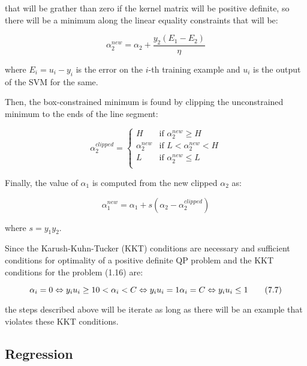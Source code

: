 that will be grather than zero if the kernel matrix will be positive definite, so there will be a minimum along the linear equality constraints that will be:

\begin{equation}
	\alpha_2^{new} = \alpha_2 + \frac{y_2(E_1 - E_2)}{\eta} \tag{7.4}
\end{equation}

where $E_i = u_i - y_i$ is the error on the $i$-th training example and $u_i$ is the output of the SVM for the same.

Then, the box-constrained minimum is found by clipping the unconstrained minimum to the ends of the line segment:

\begin{equation}
    \alpha_2^{clipped} =
        \begin{cases}
            H & \text{if } \alpha_2^{new} \geq H \\
            \alpha_2^{new} & \text{if } L < \alpha_2^{new} < H \\
            L & \text{if } \alpha_2^{new} \leq L \\
        \end{cases} \tag{7.5}
\end{equation}

Finally, the value of $\alpha_1$ is computed from the new clipped $\alpha_2$ as:

\begin{equation}
	\alpha_1^{new} = \alpha_1 + s (\alpha_2 - \alpha_2^{clipped}) \tag{7.6}
\end{equation}

where $s = y_1 y_2$.

Since the Karush-Kuhn-Tucker (KKT) conditions are necessary and sufficient conditions for optimality of a positive definite QP problem and the KKT conditions for the problem (1.16) are:

\begin{equation}
	\alpha_i = 0 \Leftrightarrow y_i u_i \geq 1 \\
	0 < \alpha_i < C \Leftrightarrow y_i u_i = 1 \\
	\alpha_i = C \Leftrightarrow y_i u_i \leq 1 \tag{7.7}
\end{equation}

the steps described above will be iterate as long as there will be an example that violates these KKT conditions.

\subsection{Regression}